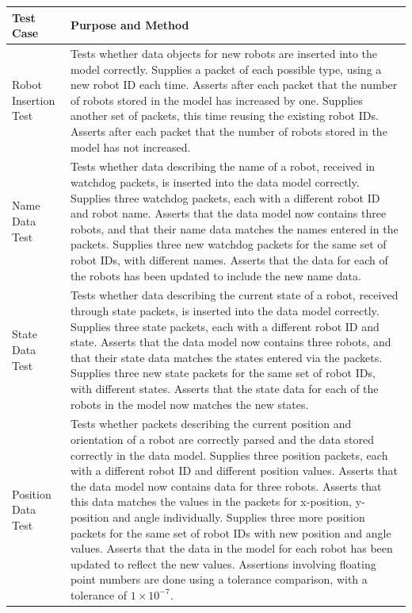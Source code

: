 \begin{longtable}{ l p{10cm} }
 \textbf{Test Case} & \textbf{Purpose and Method}\\
 \hline
 Robot Insertion Test & Tests whether data objects for new robots are inserted into the model correctly. Supplies a packet of each possible type, using a new robot ID each time. Asserts after each packet that the number of robots stored in the model has increased by one. Supplies another set of packets, this time reusing the existing robot IDs. Asserts after each packet that the number of robots stored in the model has not increased.\\
\hline
 Name Data Test & Tests whether data describing the name of a robot, received in watchdog packets, is inserted into the data model correctly. Supplies three watchdog packets, each with a different robot ID and robot name. Asserts that the data model now contains three robots, and that their name data matches the names entered in the packets. Supplies three new watchdog packets for the same set of robot IDs, with different names. Asserts that the data for each of the robots has been updated to include the new name data.\\
\hline
 State Data Test & Tests whether data describing the current state of a robot, received through state packets, is inserted into the data model correctly. Supplies three state packets, each with a different robot ID and state. Asserts that the data model now contains three robots, and that their state data matches the states entered via the packets. Supplies three new state packets for the same set of robot IDs, with different states. Asserts that the state data for each of the robots in the model now matches the new states.\\
\hline
 Position Data Test & Tests whether packets describing the current position and orientation of a robot are correctly parsed and the data stored correctly in the data model. Supplies three position packets, each with a different robot ID and different position values. Asserts that the data model now contains data for three robots. Asserts that this data matches the values in the packets for x-position, y-position and angle individually. Supplies three more position packets for the same set of robot IDs with new position and angle values. Asserts that the data in the model for each robot has been updated to reflect the new values. Assertions involving floating point numbers are done using a tolerance comparison, with a tolerance of $ 1 \times 10^{-7} $.\\

\end{longtable}
